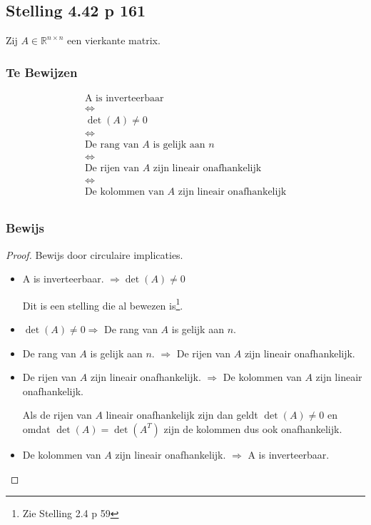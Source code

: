 \documentclass[lineaire_algebra_oplossingen.tex]{subfiles}
\begin{document}
\subsection{Stelling 4.42 p 161}
\label{4.42}
Zij $A\in \mathbb{R}^{n \times n}$ een vierkante matrix.

\subsubsection*{Te Bewijzen}
\begin{gather*}
\text{A is inverteerbaar} \\
\Leftrightarrow \\
\det(A) \neq 0 \\
\Leftrightarrow \\
\text{De rang van $A$ is gelijk aan $n$} \\
\Leftrightarrow \\
\text{De rijen van $A$ zijn lineair onafhankelijk} \\
\Leftrightarrow \\
\text{De kolommen van $A$ zijn lineair onafhankelijk} \\
\end{gather*}

\subsubsection*{Bewijs}
\begin{proof}
Bewijs door circulaire implicaties.
\begin{itemize}
\item
A is inverteerbaar. $\Rightarrow \det(A) \neq 0$

Dit is een stelling die al bewezen is\footnote{Zie Stelling 2.4 p 59}.

\item
$\det(A) \neq 0 \Rightarrow $ De rang van $A$ is gelijk aan $n$.


\item
De rang van $A$ is gelijk aan $n$. $\Rightarrow $ De rijen van $A$ zijn lineair onafhankelijk.


\item
De rijen van $A$ zijn lineair onafhankelijk. $\Rightarrow$ De kolommen van $A$ zijn lineair onafhankelijk.

Als de rijen van $A$ lineair onafhankelijk zijn dan geldt $\det(A) \neq 0$ en omdat $\det(A) = \det(A^T)$ zijn de kolommen dus ook onafhankelijk.

\item
De kolommen van $A$ zijn lineair onafhankelijk. $\Rightarrow$ A is inverteerbaar.

\end{itemize}
\end{proof}
\end{document}
